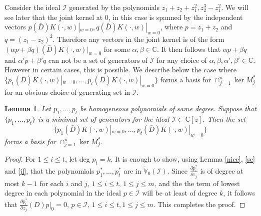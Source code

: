 \documentclass[11pt]{amsart}
\newtheorem{lem}[thm]{Lemma}
\theoremstyle{definition}
\numberwithin{equation}{section}
\begin{document}
Consider the ideal $\mathcal I$ generated by the polynomials $z_1+z_2+z_1^2, z_2^3-z_1^2$. We will see later that the joint kernel at $0$, in this case is spanned by the independent vectors $p(\bar D)K(\cdot,w)|_{w=0}, q(\bar D)K(\cdot,w)|_{w=0}$, where $p=z_1+z_2$ and $q=(z_1 - z_2)^2$. Therefore any vectors in the joint kernel is of the form $(\alpha p+\beta q)(\bar D)K(\cdot,w)|_{w=0}$ for some $\alpha,\beta\in{{\mathbb C}}$. It then follows that $\alpha p+\beta q$ and $\alpha' p+\beta' q$ can not be a set of generators of $\mathcal I$ for any choice of $\alpha,\beta,\alpha',\beta'\in{{\mathbb C}}$. However in certain cases, this is possible. We describe below the case where $\{p_1(\bar D)K(\cdot,w)|_{w=0},...,p_t(\bar
D)K(\cdot,w)|_{w=0}\}$ forms a basis for $\cap_{j=1}^n \ker M_j^*$ for an obvious choice of generating set in $\mathcal I$.

\begin{lem}\label{kth} Let $p_1,\ldots,p_t$ be homogeneous polynomials of same degree. Suppose that $\{p_1,\ldots,p_t\}$ is a minimal set of generators for the ideal $\mathcal I\subset{{\mathbb C}}[\underline{z}]$.  Then the set 
$$
\{p_1(\bar D)K(\cdot,w)|_{w=0},...,p_t(\bar
D)K(\cdot,w)|_{w=0}\}
$$ 
forms a basis for $ \displaystyle\cap_{j=1}^n \ker M_j^*$.
\end{lem}
\begin{proof}
For $1\leq i\leq t$, let deg $p_i=k$. It is enough to show, using Lemma \ref{nice}, \ref{sc} and \ref{jl}, that the polynomials $p_1^*,\ldots,p_t^*$ are in $\tilde{\mathbb V}_{0}(\mathcal I)$. Since $\frac{\partial p_i^*}{\partial z_j}$ is of degree at most $k-1$ for each $i$ and $j,\,1\leq i\leq t,\,1\leq j\leq m$, and the the term of lowest degree in each polynomial in the ideal $p\in\mathcal I$ will be at least of degree $k$, it follows that $\frac{\partial p_i^*}{\partial z_j}(D)p|_0=0,\,p\in\mathcal I,\,1\leq i\leq t,1\leq j\leq m$. This completes the proof.
\end{proof}
\end{document}
